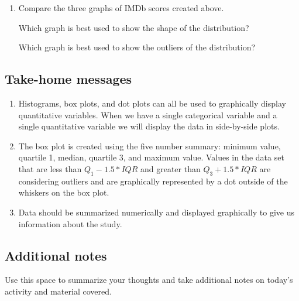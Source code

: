 \documentclass[
]{report}
\begin{document}
\vspace{1.5in}

\begin{enumerate}
\def\labelenumi{\arabic{enumi}.}
\setcounter{enumi}{12}
\item
  Compare the three graphs of IMDb scores created above.

  Which graph is best used to show the shape of the distribution?

  \vspace{0.5in}

  Which graph is best used to show the outliers of the distribution?

  \vspace{0.5in}
\end{enumerate}

\hypertarget{take-home-messages-5}{%
\subsection{Take-home messages}\label{take-home-messages-5}}

\begin{enumerate}
\def\labelenumi{\arabic{enumi}.}
\item
  Histograms, box plots, and dot plots can all be used to graphically display quantitative variables. When we have a single categorical variable and a single quantitative variable we will display the data in side-by-side plots.
\item
  The box plot is created using the five number summary: minimum value, quartile 1, median, quartile 3, and maximum value. Values in the data set that are less than \(Q_1 - 1.5*IQR\) and greater than \(Q_3 + 1.5*IQR\) are considering outliers and are graphically represented by a dot outside of the whiskers on the box plot.
\item
  Data should be summarized numerically and displayed graphically to give us information about the study.
\end{enumerate}

\hypertarget{additional-notes-3}{%
\subsection{Additional notes}\label{additional-notes-3}}

Use this space to summarize your thoughts and take additional notes on today's activity and material covered.

\newpage
\end{document}

